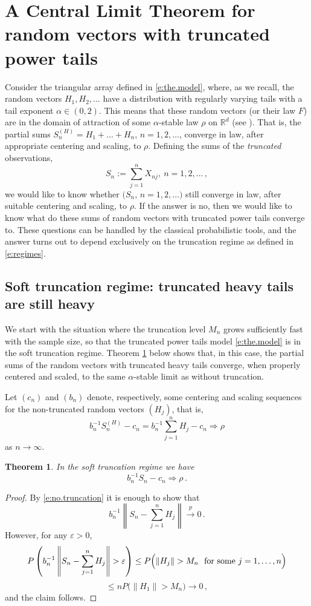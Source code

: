 \documentclass[11pt]{amsart}
\newtheorem{theorem}{Theorem}[section]
\numberwithin{equation}{section}
\begin{document}
\section{A Central Limit Theorem for random vectors with truncated
  power tails}
\label{sec:CLT}

Consider the triangular array defined in \eqref{e:the.model}, where,
as we recall, the random vectors $H_1,H_2,\ldots$ have a distribution
with regularly
varying tails with a tail exponent $\alpha\in (0,2)$. This means that
these random vectors (or their law $F$) are in the domain of
attraction of some $\alpha$-stable law $\rho$ on ${{\mathbb R}}^d$ (see
\cite{rvaceva:1962}). That is, the partial sums $ S_n^{(H)} =
H_1+\ldots + H_n$, $n=1,2,\ldots$, converge in law, after appropriate
centering and scaling, to $\rho$. Defining the sums of the {\it truncated}
observations,
$$
S_n:=\sum_{j=1}^nX_{nj}, \ n=1,2,\ldots\,,
$$
we would like to know whether $\bigl( S_n,\, n=1,2,\ldots\bigr)$ still
converge in law, after suitable centering and scaling, to $\rho$. If
the answer is no, then we would like to know what do these sums of
random vectors with truncated power tails converge to. These questions
can be handled by the classical probabilistic tools, and the answer
turns out to depend exclusively on the truncation regime as defined in
\eqref{e:regimes}.

\subsection{Soft truncation regime: truncated heavy tails are still heavy}

We start with the situation where the truncation level $M_n$ grows
sufficiently fast with the sample size, so that the truncated power
tails model \eqref{e:the.model} is in the soft truncation
regime. Theorem \ref{t1} below shows that, in this case, the partial
sums of the random vectors with truncated heavy tails converge, when
properly centered and scaled, to the same $\alpha$-stable limit as
without truncation.

Let $(c_n)$ and $(b_n)$ denote, respectively, some centering and
scaling sequences for the non-truncated random vectors $(H_j)$, that is,
\begin{equation} \label{e:no.truncation}
b_n^{-1}S_n^{(H)} -c_n =
b_n^{-1}\sum_{j=1}^nH_j-c_n\Longrightarrow\rho
\end{equation}
as $n\to\infty$.

\begin{theorem}\label{t1} In the soft truncation regime we have
\begin{equation}\label{e:soft.same}
b_n^{-1}S_n-c_n\Longrightarrow\rho\,.
\end{equation}
\end{theorem}
\begin{proof} By \eqref{e:no.truncation} it is enough to show that
$$
b_n^{-1}\left\|S_n-\sum_{j=1}^nH_j\right\|\stackrel
p\longrightarrow0\,.
$$
However, for any ${\varepsilon}>0$,
$$
P\left( b_n^{-1}\left\|S_n-\sum_{j=1}^nH_j\right\|>{\varepsilon}\right)
\leq P\Bigl( \|H_j\|>M_n \ \ \text{for some $j=1,\ldots, n$}\Bigr)
$$
$$
\leq nP\bigl( \|H_1\|>M_n\bigr)\to 0\,,
$$
and the claim follows.
\end{proof}
\end{document}
